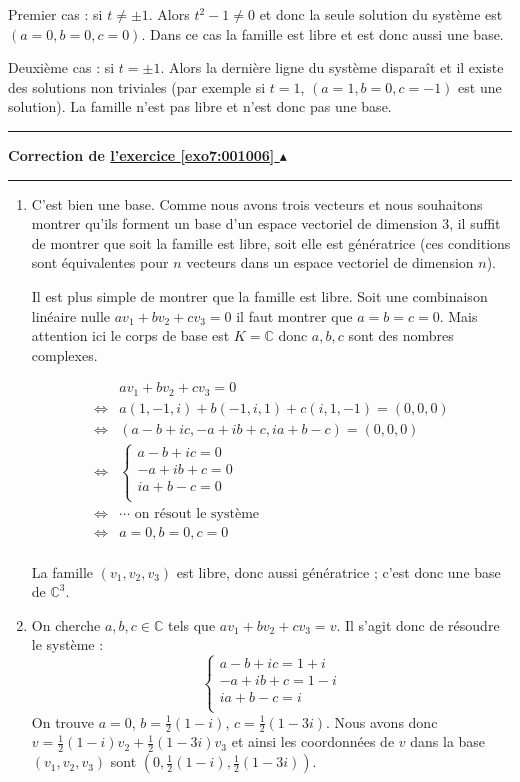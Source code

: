 \documentclass[11pt,a4paper]{article}
\newcommand{\Cc}{\mathbb{C}} \newcommand{\C}{\mathbb{C}}
\newcounter{exo}
\newcommand{\correction}[1]{\hypertarget{cor7:#1}{}\label{cor7:#1}{\bf Correction de \hyperlink{exo7:#1}{l'exercice \ref{exo7:#1} $\blacktriangle$}}\vspace{1mm}\hrule\vspace{1mm}}
\newcommand{\fincorrection}{\vspace{1mm}\hrule\vspace*{7mm}}
\begin{document}
Premier cas : si $t\neq \pm 1$. Alors $t^2-1 \neq 0$ et donc
la seule solution du système est $(a=0,b=0,c=0)$.
Dans ce cas la famille est libre et est donc aussi une base.


Deuxième cas : si $t=\pm1$. Alors la dernière ligne du système disparaît
et il existe des solutions non triviales (par exemple si $t=1$, $(a=1,b=0,c=-1)$ est une solution).
La famille n'est pas libre et n'est donc pas une base. 
\fincorrection
\correction{001006}
\begin{enumerate}
  \item C'est bien une base. Comme nous avons trois vecteurs et nous souhaitons 
montrer qu'ils forment un base d'un espace vectoriel de dimension $3$, 
il suffit de montrer que soit la famille est libre, soit elle est génératrice
(ces conditions sont équivalentes pour $n$ vecteurs dans un espace vectoriel de dimension $n$).

Il est plus simple de montrer que la famille est libre. Soit une combinaison linéaire nulle
$a v_1+b v_2+c v_3=0$  il faut montrer que $a=b=c=0$. Mais attention ici le corps de base est $K=\Cc$
donc $a,b,c$ sont des nombres complexes.

\begin{align*}
     &  a v_1+b v_2+c v_3=0 \\
\iff & a (1,-1,i) + b (-1,i,1) + c (i,1,-1) = (0,0,0) \\
\iff & (a-b+ic,-a+ib+c,ia+b-c)=(0,0,0) \\
\iff & \begin{cases}
        a-b+ic  = 0 \\
        -a+ib+c = 0  \\
        ia+b-c = 0 \\
       \end{cases} \\
\iff & \cdots \text{ on résout le système } \\
\iff & a=0, b=0, c=0 \\
\end{align*}

La famille $(v_1,v_2,v_3)$ est libre, donc aussi génératrice ; c'est donc une base de $\Cc^3$.




  \item On cherche $a,b,c \in \Cc$ tels que $a v_1+b v_2+c v_3=v$.
Il s'agit donc de r\'esoudre le syst\`eme :
$$ \begin{cases} 
a  -b +ic = 1+i \\ 
-a + ib  +c = 1-i \\ 
ia+b-c = i \\
\end{cases}$$
On trouve $a=0$, $b=\frac12(1-i)$, $c=\frac12(1-3i)$.
Nous avons donc $v = \frac12(1-i) v_2 + \frac12(1-3i) v_3$ et ainsi
 les coordonn\'ees de $v$ dans la base $(v_1,v_2,v_3)$ sont
$(0,\frac12(1-i),\frac12(1-3i))$.
\end{enumerate}
\end{document}
